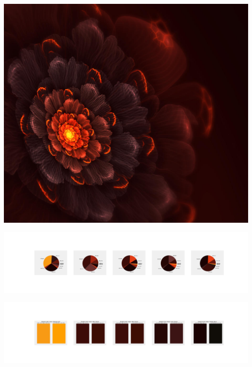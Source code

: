 \documentclass[11pt]{article}
\begin{document}
\begin{landscape}
    \begin{center}
    \includegraphics[width=\textwidth]{./nbimg/file (189).jpg}
    \end{center}

    \begin{center}
    \includegraphics[width=250mm]{./nbimg/pie-99.jpg}
    \end{center}

    \begin{center}
    \includegraphics[width=250mm]{./nbimg/peak-99.jpg}
    \end{center}
    


\end{landscape}
\end{document}
